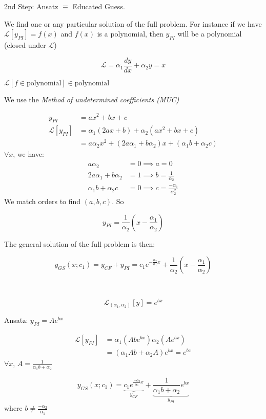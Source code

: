 \documentclass[twoside]{scrartcl}
\begin{document}
2nd Step: 
Ansatz $\equiv$ Educated Guess.

 We find one or any particular solution of the full problem. For instance if we have $\mathcal{L}[y_{PI}] = f(x)$ and $f(x)$ is a polynomial, then $y_{PI}$ will be a polynomial (closed under $\mathcal{L}$)\\

\begin{example}
\[\mathcal{L} = \alpha_1\frac{dy}{dx} + \alpha_2y = x\]	

$\mathcal{L}[f \in \mbox{polynomial}] \in \mbox{polynomial}$

We use the \emph{Method of undetermined coefficients (MUC)}

\[
\begin{aligned}
  y_{PI} &= ax^2 + bx + c\\
  \mathcal{L}[y_{PI}] &= \alpha_1(2ax + b) + \alpha_2(ax^2 + bx + c)\\
  &= a\alpha_2x^2 + (2a\alpha_1 + b\alpha_2)x + (\alpha_1b + \alpha_2c)
\end{aligned}
\]
$\forall x$, we have: 
\[
\begin{aligned}
  a\alpha_2 & = 0 \implies a = 0\\
  2a\alpha_1 + b\alpha_2 &= 1\implies b = \frac{1}{\alpha_2}\\
  \alpha_1b + \alpha_2c &= 0 \implies c = \frac{-\alpha_1}{\alpha_2^2}
\end{aligned}
\]
We match orders to find $(a,b,c)$. So 

\[y_{PI} = \frac{1}{\alpha_2}\left(x-\frac{\alpha_1}{\alpha_2}\right)\]

The general solution of the full problem is then: 

\[y_{GS}(x;c_1) = y_{CF} + y_{PI} = c_1e^{-\frac{\alpha_2}{\alpha_1}x} + \frac{1}{\alpha_2}\left(x-\frac{\alpha_1}{\alpha_2}\right)\]
\end{example}~\vspace*{5pt}

\begin{example}
\[\mathcal{L}_{(\alpha_1,\alpha_2)}[y] = e^{bx}\]

Ansatz: $y_{PI} = Ae^{bx}$	

\[
\begin{aligned}
  \mathcal{L}[y_{PI}] &= \alpha_1(Abe^{bx}) \alpha_2(Ae^{bx})\\
  &= (\alpha_1Ab + \alpha_2A)e^{bx} = e^{bx}
\end{aligned}
\]
$\forall x$, $A = \frac{1}{\alpha_1b + \alpha_2}$

\[
  y_{GS}(x;c_1) = \underbrace{c_1e^{\frac{-\alpha_2}{\alpha_1}x}}_{y_{CF}} + \underbrace{\frac{1}{\alpha_1b+\alpha_2}e^{bx}}_{y_{PI}}
\]
where $b \neq \frac{-\alpha_2}{\alpha_1}$
\end{example}~\vspace*{5pt}
\end{document}
